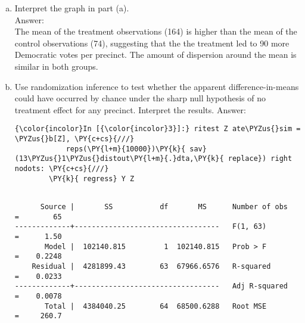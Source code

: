 \documentclass[11pt,notitlepage]{article}\usepackage[]{graphicx}\usepackage[]{color}
\makeatletter
\newenvironment{kframe}{%
 \def\at@end@of@kframe{}%
 \ifinner\ifhmode%
  \def\at@end@of@kframe{\end{minipage}}%
  \begin{minipage}{\columnwidth}%
 \fi\fi%
 \def\FrameCommand##1{\hskip\@totalleftmargin \hskip-\fboxsep
 \colorbox{shadecolor}{##1}\hskip-\fboxsep
     \hskip-\linewidth \hskip-\@totalleftmargin \hskip\columnwidth}%
 \MakeFramed {\advance\hsize-\width
   \@totalleftmargin\z@ \linewidth\hsize
   \@setminipage}}%
 {\par\unskip\endMakeFramed%
 \at@end@of@kframe}
\newenvironment{knitrout}{}{} %
\makeatother
\begin{document}
\begin{enumerate}[a)]
\begin{knitrout}
\begin{kframe}
\begin{Verbatim}[commandchars=\\\{\}]
        \PY{k}{graph} export ..\PY{o}{/}results\PY{o}{/}chapter13\PY{o}{/}exercise\PYZus{}13\PYZus{}1\PYZus{}a\PYZus{}graph\PY{l+m}{.}pdf
\end{Verbatim}
\end{kframe}

{\centering \texttt{[image: ../data/Stata\_version/figure/exercise\_13\_1\_a\_graph.pdf]} 

}



\end{knitrout}


\item Interpret the graph in part (a).\\
Answer:\\
The mean of the treatment observations (164) is higher than the mean of the control observations (74), suggesting that the the treatment led to 90 more Democratic votes per precinct.  The amount of dispersion around the mean is similar in both groups.

\item Use randomization inference to test whether the apparent difference-in-means could
have occurred by chance under the sharp null hypothesis of no treatment effect for
any precinct. Interpret the results.
Answer:\\
\begin{knitrout}
\color{fgcolor}\begin{kframe}
    \begin{Verbatim}[commandchars=\\\{\}]
{\color{incolor}In [{\color{incolor}3}]:} ritest Z ate\PYZus{}sim = \PYZus{}b[Z], \PY{c+cs}{///}
        	reps(\PY{l+m}{10000})\PY{k}{ sav}(13\PYZus{}1\PYZus{}distout\PY{l+m}{.}dta,\PY{k}{ replace}) right nodots: \PY{c+cs}{///}
        \PY{k}{	regress} Y Z
\end{Verbatim}

    \begin{Verbatim}[commandchars=\\\{\}]

      Source |       SS           df       MS      Number of obs   =        65
-------------+----------------------------------   F(1, 63)        =      1.50
       Model |  102140.815         1  102140.815   Prob > F        =    0.2248
    Residual |  4281899.43        63  67966.6576   R-squared       =    0.0233
-------------+----------------------------------   Adj R-squared   =    0.0078
       Total |  4384040.25        64  68500.6288   Root MSE        =     260.7


\end{Verbatim}
\end{kframe}
\end{knitrout}
\end{enumerate}
\end{document}
